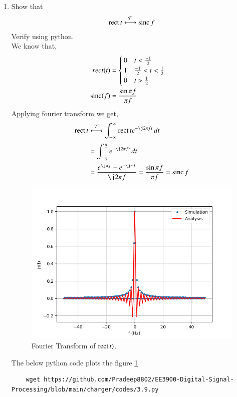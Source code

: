 \documentclass[journal,12pt,twocolumn]{IEEEtran}
\renewcommand\thesection{\arabic{section}}
\begin{document}
\begin{enumerate}[label=\thesection.\arabic*
	,ref=\thesection.\theenumi]
\begin{lstlisting}
	\end{lstlisting} 
%	
	\item Show that
	\begin{align}
		\mathop{\mathrm{rect}}{t} \overset{\mathcal{F}}{ \longleftrightarrow} \mathop{\mathrm{sinc}}{f}
	\end{align}
	Verify using python.\\
	\solution We know that,
	\begin{align}
		rect(t)&=
	\begin{cases}
		0 \quad t<\frac{-1}{2}\\
		1 \quad \frac{-1}{2}<t<\frac{1}{2}\\
		0 \quad t>\frac{1}{2}
	\end{cases}\\
\mathop{\mathrm{sinc}}(f)&=\frac{\sin{\pi f}}{\pi f}
	\end{align}
Applying fourier transform we get,
	\begin{align}
		\rect{t}&\system{F}\int_{-\infty}^{\infty}\rect{t} e^{-\j2\pi ft}\, dt \\
		&=\int_{-\frac{1}{2}}^{\frac{1}{2}}e^{-\j 2\pi ft}\, dt \\
		\label{eq:fourierrect}
		&=\frac{e^{\j\pi f} - e^{-\j\pi f}}{\j2\pi f} = \frac{\sin{\pi f}}{\pi f} = \sinc{f}
	\end{align}
	\begin{figure}[!ht]
	\includegraphics[width=\columnwidth]{figs/3.9.png}
	\caption{Fourier Transform of $\mathop{\mathrm{rect}}{t})$.}
	\label{fig:3.9}
\end{figure}
The below python code plots the figure \ref{fig:3.9}
	\begin{lstlisting}
	wget https://github.com/Pradeep8802/EE3900-Digital-Signal-Processing/blob/main/charger/codes/3.9.py
\end{lstlisting} 


\end{enumerate}
\end{document}
